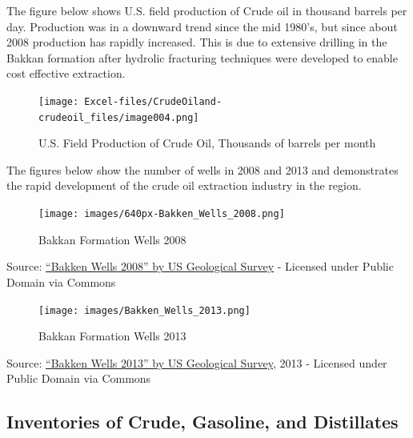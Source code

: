 \documentclass[
  letterpaper,
  DIV=11,
  numbers=noendperiod]{scrreprt}
\begin{document}
The figure below shows U.S. field production of Crude oil in thousand
barrels per day. Production was in a downward trend since the mid
1980's, but since about 2008 production has rapidly increased. This is
due to extensive drilling in the Bakkan formation after hydrolic
fracturing techniques were developed to enable cost effective
extraction.

\begin{figure}[H]

{\centering \texttt{[image: Excel-files/CrudeOiland-crudeoil\_files/image004.png]}

}

\caption{U.S. Field Production of Crude Oil, Thousands of barrels per
month}

\end{figure}%

The figures below show the number of wells in 2008 and 2013 and
demonstrates the rapid development of the crude oil extraction industry
in the region.

\begin{figure}[H]

{\centering \texttt{[image: images/640px-Bakken\_Wells\_2008.png]}

}

\caption{Bakkan Formation Wells 2008}

\end{figure}%

Source:
\href{https://commons.wikimedia.org/wiki/File:Bakken_Wells_2008.png\#/media/File:Bakken_Wells_2008.png}{``Bakken
Wells 2008'' by US Geological Survey} - Licensed under Public Domain via
Commons

\begin{figure}[H]

{\centering \texttt{[image: images/Bakken\_Wells\_2013.png]}

}

\caption{Bakkan Formation Wells 2013}

\end{figure}%

Source:
\href{https://commons.wikimedia.org/wiki/File:Bakken_Wells_2013.png\#/media/File:Bakken_Wells_2013.png}{``Bakken
Wells 2013'' by US Geological Survey}, 2013 - Licensed under Public
Domain via Commons

\subsection{Inventories of Crude, Gasoline, and
Distillates}\label{inventories-of-crude-gasoline-and-distillates}
\end{document}
